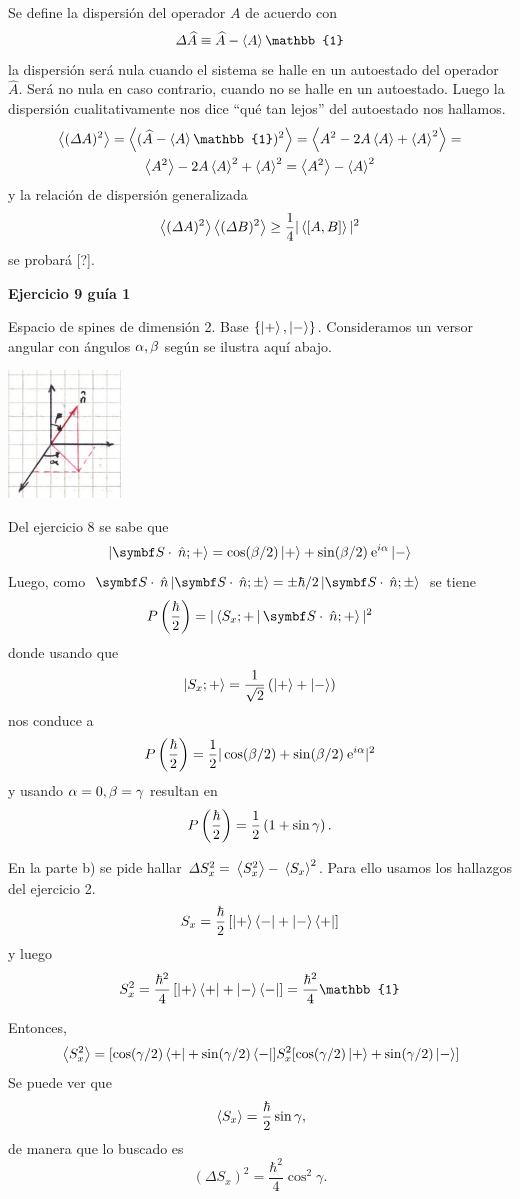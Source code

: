 \documentclass[10pt,oneside]{CBFT_book}
\begin{document}
Se define la dispersión del operador $A$ de acuerdo con
\[
	\Delta \widehat{A} \equiv \widehat{A} - \Braket{A}\mathbb{1}
\]
la dispersión será nula cuando el sistema se halle en un autoestado del operador $\widehat{A}$. 
Será no nula en caso contrario, cuando no se halle en un autoestado.
Luego la dispersión cualitativamente nos dice ``qué tan lejos'' del autoestado nos hallamos.
\begin{multline*}
	\Braket{(\Delta A)^2} = \Braket{(\widehat{A} - \Braket{A}\mathbb{1})^2} =
	\Braket{ A^2 - 2A\Braket{A} + \Braket{A}^2 } = \\
	\Braket{A^2} - 2A\Braket{A}^2 + \Braket{A}^2 = \Braket{A^2} - \Braket{A}^2
\end{multline*}
y la relación de dispersión generalizada
\[
	\Braket{(\Delta A)^2} \Braket{(\Delta B)^2} \geq \frac{1}{4}|\Braket{[ A,B ]}|^2
\]
se probará [?].

\begin{ejemplo}{\bf Ejercicio 9 guía 1}

Espacio de spines de dimensión 2. Base $\{ \Ket{+}, \Ket{-} \}$.
Consideramos un versor angular con ángulos $\alpha, \beta$ según se ilustra aquí abajo.

\includegraphics[width=0.225\textwidth]{images/fig_ft2_ejercicio91.jpg}

Del ejercicio 8 se sabe que
\[
	\Ket{\vb S\cdot\nver; +} = \cos(\b/2) \Ket{+} + \sin(\b/2) \euler^{i\a} \Ket{-}
\]
Luego, como $ \vb S\cdot\nver \Ket{\vb S\cdot\nver; \pm} = \pm \hbar/2 \Ket{\vb S\cdot\nver; \pm } $ 
se tiene
\[
	P\Frac{\hbar}{2} = |\Braket{S_x;+| \vb S\cdot\nver ; +}|^2
\]
donde usando que 
\[
	\Ket{S_x;+} = \frac{1}{\sqrt{2}} \left( \Ket{+} + \Ket{-} \right)
\]
nos conduce a
\[
	P\left( \frac{ \hbar }{ 2 } \right) = \frac{1}{2} | \cos(\beta/2) + \sin(\beta/2) \:\mathrm{e}^{i\alpha} |^2
\] 
y usando $\alpha=0, \beta=\gamma $ resultan en
\[
	P\left( \frac{ \hbar }{ 2 } \right) = \frac{1}{2} \left( 1 + \sin\gamma \right).
\]

En la parte b) se pide hallar $\Delta S_x^2 = \:\left\langle S_x^2 \right\rangle- \:\left\langle S_x \right\rangle^2 $. Para ello
usamos los hallazgos del ejercicio 2.
\[
	S_x = \frac{\hbar}{2} \left[ \Ket{+}\Bra{-} + \Ket{-}\Bra{+} \right]
\] 
y luego
\[
	S_x^2 = \frac{\hbar^2}{4}\left[ \KB{+}{+} + \KB{-}{-} \right] = 
	\frac{\hbar^2}{4}\mathbb{1}
\]

Entonces,
\[
	\:\left\langle S_x^2 \right\rangle = [ \cos(\gamma/2) \Bra{+} + \sin(\gamma/2) \Bra{-} ] S_x^2
	[ \cos(\gamma/2) \Ket{+} + \sin(\gamma/2) \Ket{-} ]
\]
Se puede ver que
\[
	\:\left\langle S_x \right\rangle = \frac{\hbar}{2} \sin\gamma,
\]
de manera que lo buscado es
\[
	(\Delta S_x)^2 = \frac{\hbar^2}{4} \cos^2\gamma.
\]
 
 
\end{ejemplo}
\end{document}
